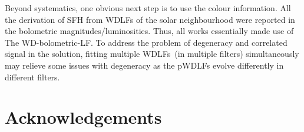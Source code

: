 \documentclass[fleqn,usenatbib]{mnras}
\begin{document}
Beyond systematics, one obvious next step is to use the colour information.
All the derivation of SFH from WDLFs of the solar neighbourhood were reported
in the bolometric magnitudes/luminosities. Thus, all works essentially made use
of The WD-bolometric-LF. To address the problem of degeneracy and correlated
signal in the solution, fitting multiple WDLFs~(in multiple filters)
simultaneously may relieve some issues with degeneracy as the pWDLFs evolve
differently in different filters.

\section*{Acknowledgements}












\appendix

\end{document}
